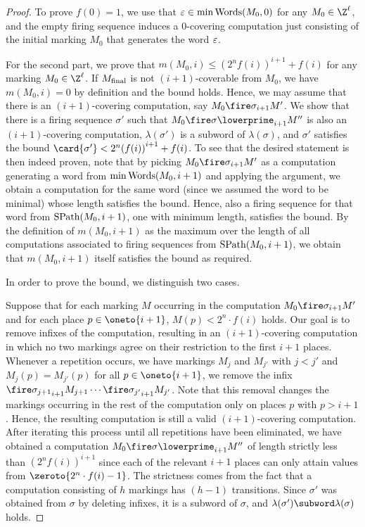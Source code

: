 \documentclass[../../diss.tex]{subfiles}
\begin{document}
\begin{proof}
    To prove $f(0) = 1$, we use that $\varepsilon \in \min \text{Words}(M_0,0)$ for any $M_0 \in \Z^{\ell}$, and the empty firing sequence induces a $0$-covering computation just consisting of the initial marking $M_0$ that generates the word $\varepsilon$.

    For the second part, we prove that $m(M_0,i) \leq {(2^n f(i))}^{i+1} + f(i)$ for any marking $M_0 \in \Z^\ell$.
    If $M_{\text{final}}$ is not $(i+1)$-coverable from $M_0$, we have $m(M_0,i) = 0$ by definition and the bound holds.
    Hence, we may assume that there is an $(i+1)$-covering computation, say $M_0 \fireipo{\sigma} M'$.
    We show that there is a firing sequence $\sigma'$ such that $M_0 \fireipo{\sigma\lowerprime} M''$ is also an $(i+1)$-covering computation, $\lambda(\sigma')$ is a subword of $\lambda(\sigma)$, and $\sigma'$ satisfies the bound $\card{\sigma'} < 2^n {(f(i))}^{i+1} + f(i)$.
    To see that the desired statement is then indeed proven, note that by picking $M_0 \fireipo{\sigma} M'$ as a computation generating a word from $\min \text{Words}(M_0,i+1)$ and applying the argument, we obtain a computation for the same word (since we assumed the word to be minimal) whose length satisfies the bound.
    Hence, also a firing sequence for that word from $\text{SPath}(M_0,i+1)$, \ie one with minimum length, satisfies the bound.
    By the definition of $m(M_0,i+1)$ as the maximum over the length of all computations associated to firing sequences from $\text{SPath}(M_0,i+1)$, we obtain that $m(M_0,i+1)$ itself satisfies the bound as required.


    In order to prove the bound, we distinguish two cases.

    Suppose that for each marking $M$ occurring in the computation $M_0 \fireipo{\sigma} M'$ and for each place $p \in \oneto{i+1}$, $M(p) < 2^n \cdot f(i)$ holds.
    Our goal is to remove infixes of the computation, resulting in an $(i+1)$-covering computation in which no two markings agree on their restriction to the first $i+1$ places.
    Whenever a repetition occurs, \ie we have markings $M_j$ and $M_{j'}$ with $j < j'$ and $M_j (p) = M_{j'}(p)$ for all $p \in \oneto{i+1}$, we remove the infix $\fireipo{\sigma_{j+1}} M_{j+1} \cdots \fireipo{\sigma_{j'}} M_{j'}$.
    Note that this removal changes the markings occurring in the rest of the computation only on places $p$ with $p > i+1$.
    Hence, the resulting computation is still a valid $(i+1)$-covering computation.
    After iterating this process until all repetitions have been eliminated, we have obtained a computation $M_0 \fireipo{\sigma\lowerprime} M''$ of length strictly less than
    \(
        {(2^n f(i))}^{i+1}
    \)
    since each of the relevant $i+1$ places can only attain values from $\zeroto{2^n \cdot f(i) - 1}$.
    The strictness comes from the fact that a computation consisting of $h$ markings has $(h-1)$ transitions.
    Since $\sigma'$ was obtained from $\sigma$ by deleting infixes, it is a subword of $\sigma$, and $\lambda(\sigma') \subword \lambda(\sigma)$ holds.


\end{proof}
\end{document}

